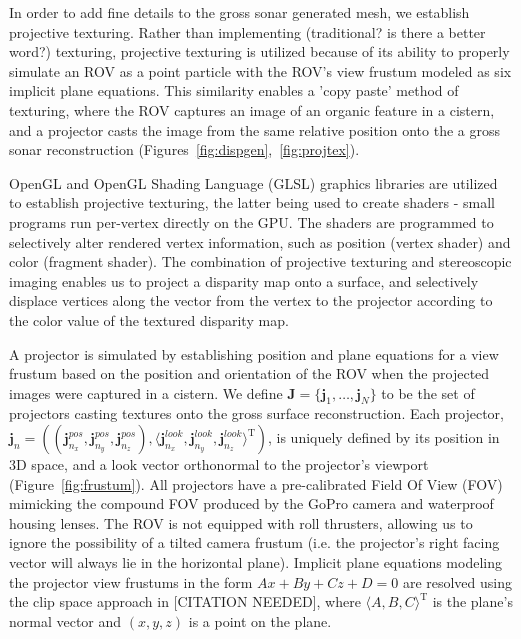 \documentclass[a4paper,twoside]{article}
\begin{document}

\noindent In order to add fine details to the gross sonar generated mesh, we establish projective texturing. Rather than implementing (traditional? is there a better word?) texturing, projective texturing is utilized because of its ability to properly simulate an ROV as a point particle with the ROV's view frustum modeled as six implicit plane equations. This similarity enables a 'copy paste' method of texturing, where the ROV captures an image of an organic feature in a cistern, and a projector casts the image from the same relative position onto the a gross sonar reconstruction (Figures~\ref{fig:dispgen},~\ref{fig:projtex}). 

OpenGL and OpenGL Shading Language (GLSL) graphics libraries are utilized to establish projective texturing, the latter being used to create shaders - small programs run per-vertex directly on the GPU. The shaders are programmed to selectively alter rendered vertex information, such as position (vertex shader) and color (fragment shader). The combination of projective texturing and stereoscopic imaging enables us to project a disparity map onto a surface, and selectively displace vertices along the vector from the vertex to the projector according to the color value of the textured disparity map. 

A projector is simulated by establishing position and plane equations for a view frustum based on the position and orientation of the ROV when the projected images were captured in a cistern.  We define $\mathbf{J} = \{\mathbf{j}_{1},\dots,\mathbf{j}_{N}\}$ to be the set of projectors casting textures onto the gross surface reconstruction. Each projector, $\mathbf{j}_{n} = ((\mathbf{j}_{n_{x}}^{pos},\mathbf{j}_{n_{y}}^{pos},\mathbf{j}_{n_{z}}^{pos}), \langle \mathbf{j}_{n_{x}}^{look},\mathbf{j}_{n_{y}}^{look},\mathbf{j}_{n_{z}}^{look}\rangle ^{\mathrm{T}})$, is uniquely defined by its position in 3D space, and a look vector orthonormal to the projector's viewport (Figure~\ref{fig:frustum}). All projectors have a pre-calibrated Field Of View (FOV) mimicking the compound FOV produced by the GoPro camera and waterproof housing lenses. The ROV is not equipped with roll thrusters, allowing us to ignore the possibility of a tilted camera frustum (i.e. the projector's right facing vector will always lie in the horizontal plane). Implicit plane equations modeling the projector view frustums in the form $Ax + By + Cz + D = 0$ are resolved using the clip space approach in [CITATION NEEDED], where $\langle A, B, C\rangle ^ {\mathrm{T}}$ is the plane's normal vector and  $(x, y, z)$ is a point on the plane.
\end{document}
